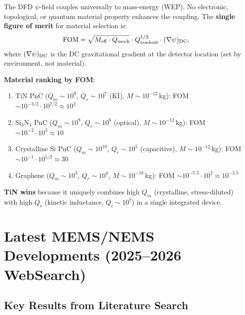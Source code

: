 \documentclass[11pt]{article}
\theoremstyle{remark}
\begin{document}
\begin{tcolorbox}[colback=violet!5!white, colframe=violet!50!black,
  title=\textbf{Material Selection Criterion for DFD Detection}]
The DFD $\psi$-field couples universally to mass-energy (WEP). No
electronic, topological, or quantum material property enhances the
coupling. The \textbf{single figure of merit} for material selection is:
\begin{equation}
  \text{FOM} = \sqrt{M_{\rm eff} \cdot Q_{\rm mech}} \cdot Q_{\rm readout}^{1/2}
  \cdot (\nabla\psi)_{\rm DC},
  \label{eq:FOM}
\end{equation}
where $(\nabla\psi)_{\rm DC}$ is the DC gravitational gradient at the
detector location (set by environment, not material).

\textbf{Material ranking by FOM}:
\begin{enumerate}[nosep]
  \item TiN PnC ($Q_m \sim 10^9$, $Q_r \sim 10^7$ (KI), $M \sim 10^{-12}$\,kg):
    FOM $\sim 10^{-3/2} \cdot 10^{7/2} \approx 10^2$
  \item Si$_3$N$_4$ PnC ($Q_m \sim 10^8$, $Q_r \sim 10^6$ (optical),
    $M \sim 10^{-12}$\,kg):
    FOM $\sim 10^{-2} \cdot 10^3 \approx 10$
  \item Crystalline Si PnC ($Q_m \sim 10^{10}$, $Q_r \sim 10^5$
    (capacitive), $M \sim 10^{-12}$\,kg):
    FOM $\sim 10^{-1} \cdot 10^{5/2} \approx 30$
  \item Graphene ($Q_m \sim 10^3$, $Q_r \sim 10^4$, $M \sim 10^{-18}$\,kg):
    FOM $\sim 10^{-7.5} \cdot 10^{2} \approx 10^{-5.5}$
\end{enumerate}

\textbf{TiN wins} because it uniquely combines high $Q_m$ (crystalline,
stress-diluted) with high $Q_r$ (kinetic inductance, $Q_i \sim 10^7$)
in a single integrated device.
\end{tcolorbox}


\section{Latest MEMS/NEMS Developments (2025--2026 WebSearch)}
\label{sec:latest}

\subsection{Key Results from Literature Search}
\end{document}
